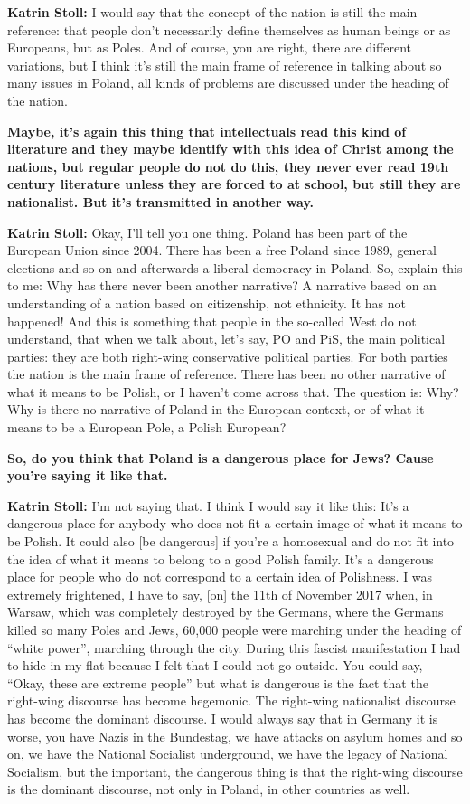 \textbf{Katrin Stoll:}  I would say that the concept of the nation is still the main reference: that people don’t necessarily define themselves as human beings or as Europeans, but as Poles. And of course, you are right, there are different variations, but I think it’s still the main frame of reference in talking about so many issues in Poland, all kinds of problems are discussed under the heading of the nation. 

\textbf{Maybe, it’s again this thing that intellectuals read this kind of literature and they maybe identify with this idea of Christ among the nations, but regular people do not do this, they never ever read 19th century literature unless they are forced to at school, but still they are nationalist. But it’s transmitted in another way.} 

\textbf{Katrin Stoll:} Okay, I’ll tell you one thing. Poland has been part of the European Union since 2004. There has been a free Poland since 1989, general elections and so on and afterwards a liberal democracy in Poland. So, explain this to me: Why has there never been another narrative? A narrative based on an understanding of a nation based on citizenship, not ethnicity. It has not happened! And this is something that people in the so-called West do not understand, that when we talk about, let’s say, PO and PiS, the main political parties: they are both right-wing conservative political parties. For both parties the nation is the main frame of reference. There has been no other narrative of what it means to be Polish, or I haven’t come across that. The question is: Why? Why is there no narrative of Poland in the European context, or of what it means to be a European Pole, a Polish European? 

\textbf{So, do you think that Poland is a dangerous place for Jews? Cause you’re saying it like that.}  
 
\textbf{Katrin Stoll:} I’m not saying that. I think I would say it like this: It’s a dangerous place for anybody who does not fit a certain image of what it means to be Polish. It could also [be dangerous] if you’re a homosexual and do not fit into the idea of what it means to belong to a good Polish family. It’s a dangerous place for people who do not correspond to a certain idea of Polishness. I was extremely frightened, I have to say, [on] the 11th of November 2017 when, in Warsaw, which was completely destroyed by the Germans, where the Germans killed so many Poles and Jews, 60,000 people were marching under the heading of “white power”, marching through the city. During this fascist manifestation I had to hide in my flat because I felt that I could not go outside. You could say, “Okay, these are extreme people” but what is dangerous is the fact that the right-wing discourse has become hegemonic. The right-wing nationalist discourse has become the dominant discourse. I would always say that in Germany it is worse, you have Nazis in the Bundestag, we have attacks on asylum homes and so on, we have the National Socialist underground, we have the legacy of National Socialism, but the important, the dangerous thing is that the right-wing discourse is the dominant discourse, not only in Poland, in other countries as well.  

